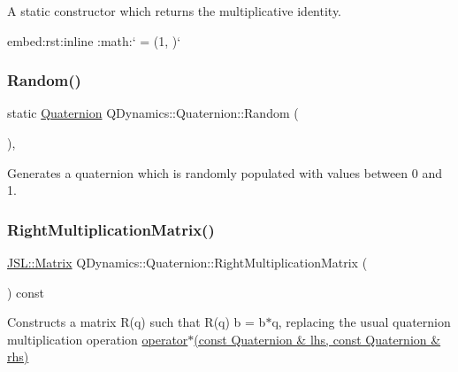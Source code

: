 A static constructor which returns the multiplicative identity. 

\begin{DoxyVerb}embed:rst:inline :math:` = \left(1, \right)` \end{DoxyVerb}
 \mbox{\label{classQDynamics_1_1Quaternion_a06386710ec4308c04a72f365382472ce}} 
\subsubsection{\texorpdfstring{Random()}{Random()}}
{\footnotesize\ttfamily static \hyperlink{classQDynamics_1_1Quaternion}{Quaternion} Q\+Dynamics\+::\+Quaternion\+::\+Random (\begin{DoxyParamCaption}{ }\end{DoxyParamCaption})\hspace{0.3cm}{\ttfamily [inline]}, {\ttfamily [static]}}



Generates a quaternion which is randomly populated with values between 0 and 1. 

\mbox{\label{classQDynamics_1_1Quaternion_a76da0390b336de90b27e713c34a3732a}} 
\subsubsection{\texorpdfstring{Right\+Multiplication\+Matrix()}{RightMultiplicationMatrix()}}
{\footnotesize\ttfamily \hyperlink{classJSL_1_1Matrix}{J\+S\+L\+::\+Matrix} Q\+Dynamics\+::\+Quaternion\+::\+Right\+Multiplication\+Matrix (\begin{DoxyParamCaption}{ }\end{DoxyParamCaption}) const\hspace{0.3cm}{\ttfamily [inline]}}



Constructs a matrix R(q) such that R(q) b = b$\ast$q, replacing the usual quaternion multiplication operation \hyperlink{namespaceQDynamics_ac40010112506831ced816640def9bc85}{operator$\ast$(const Quaternion \& lhs, const Quaternion \& rhs)} 


